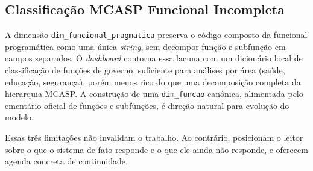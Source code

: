 \subsection{Classificação MCASP Funcional Incompleta}

A dimensão \texttt{dim\_funcional\_pragmatica} preserva o código composto da funcional programática como uma única \textit{string}, sem decompor função e subfunção em campos separados. O \textit{dashboard} contorna essa lacuna com um dicionário local de classificação de funções de governo, suficiente para análises por área (saúde, educação, segurança), porém menos rico do que uma decomposição completa da hierarquia MCASP. A construção de uma \texttt{dim\_funcao} canônica, alimentada pelo ementário oficial de funções e subfunções, é direção natural para evolução do modelo.

Essas três limitações não invalidam o trabalho. Ao contrário, posicionam o leitor sobre o que o sistema de fato responde e o que ele ainda não responde, e oferecem agenda concreta de continuidade.
